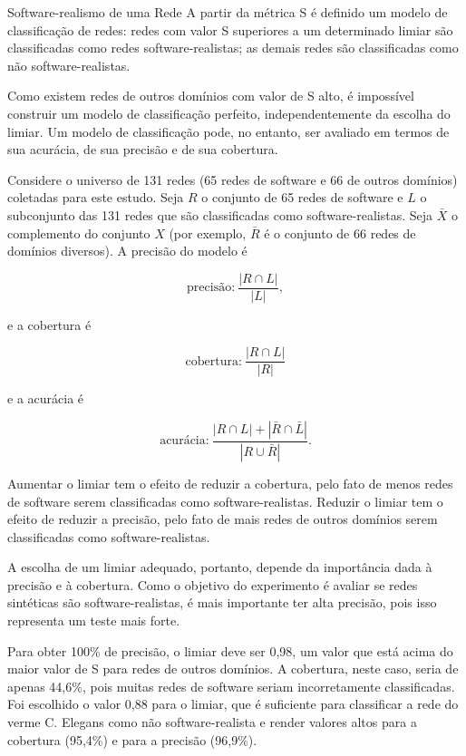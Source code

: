 \begin{section}{Software-realismo de uma Rede}
A partir da métrica S é definido um modelo de classificação de redes: redes com valor S superiores a um determinado limiar são classificadas como redes software-realistas; as demais redes são classificadas como não software-realistas.

Como existem redes de outros domínios com valor de S alto, é impossível construir um modelo de classificação perfeito, independentemente da escolha do limiar. Um modelo de classificação pode, no entanto, ser avaliado em termos de sua acurácia, de sua precisão e de sua cobertura. 

Considere o universo de 131 redes (65 redes de software e 66 de outros domínios) coletadas para este estudo. Seja $R$ o conjunto de 65 redes de software e $L$ o subconjunto das 131 redes que são classificadas como software-realistas. Seja $\bar{X}$ o complemento do conjunto $X$ (por exemplo, $\bar{R}$ é o conjunto de 66 redes de domínios diversos). A precisão do modelo é

$$
\mbox{precisão:} ~\frac{|R \cap L|}{|L|},
$$

e a cobertura é

$$
\mbox{cobertura:} ~\frac{|R \cap L|}{|R|}
$$

e a acurácia é

$$
\mbox{acurácia:} ~\frac{|R \cap L| + |\bar{R} \cap \bar{L}|}{|R \cup \bar{R}|}.
$$


Aumentar o limiar tem o efeito de reduzir a cobertura, pelo fato de menos redes de software serem classificadas como software-realistas. Reduzir o limiar tem o efeito de reduzir a precisão, pelo fato de mais redes de outros domínios serem classificadas como software-realistas.

A escolha de um limiar adequado, portanto, depende da importância dada à precisão e à cobertura. Como o objetivo do experimento é avaliar se redes sintéticas são software-realistas, é mais importante ter alta precisão, pois isso representa um teste mais forte.

Para obter 100\% de precisão, o limiar deve ser 0,98, um valor que está acima do maior valor de S para redes de outros domínios. A cobertura, neste caso, seria de apenas 44,6\%, pois muitas redes de software seriam incorretamente classificadas. Foi escolhido o valor 0,88 para o limiar, que é suficiente para classificar a rede do verme C. Elegans como não software-realista e render valores altos para a cobertura (95,4\%) e para a precisão (96,9\%).

\end{section}

